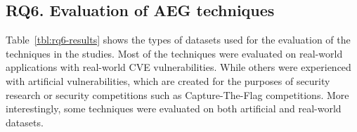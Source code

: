 \subsection{RQ6. Evaluation of AEG techniques}

{}{}

Table~\ref{tbl:rq6-results} shows the types of datasets used for the evaluation of the techniques in the studies. Most of the techniques were evaluated on real-world applications with real-world CVE vulnerabilities. While others were experienced with artificial vulnerabilities, which are created for the purposes of security research or security competitions such as Capture-The-Flag competitions. More interestingly, some techniques were evaluated on both artificial and real-world datasets.

